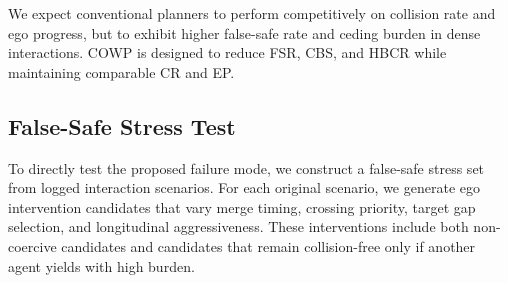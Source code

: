 \documentclass[10pt]{article}
\begin{document}
\begin{table}[t]
\centering
\caption{Closed-loop planning performance on interaction-heavy scenarios. Lower is better for CR, FSR, CBS, and HBCR. Higher is better for EP and OPR.}
\label{tab:main_results}
\end{table}

We expect conventional planners to perform competitively on collision rate and ego progress, but to exhibit higher false-safe rate and ceding burden in dense interactions. COWP is designed to reduce FSR, CBS, and HBCR while maintaining comparable CR and EP.

\subsection{False-Safe Stress Test}
\label{sec:false_safe_stress}

To directly test the proposed failure mode, we construct a false-safe stress set from logged interaction scenarios. For each original scenario, we generate ego intervention candidates that vary merge timing, crossing priority, target gap selection, and longitudinal aggressiveness. These interventions include both non-coercive candidates and candidates that remain collision-free only if another agent yields with high burden.
\end{document}
